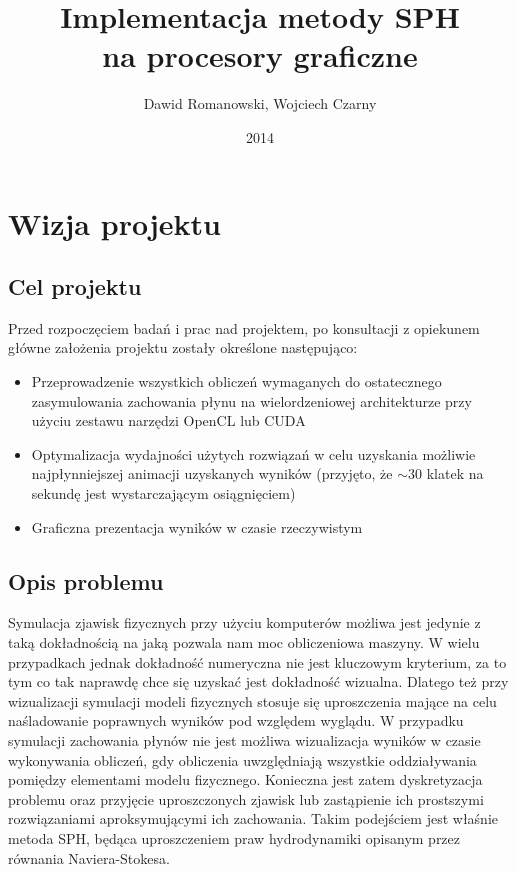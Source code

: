 \documentclass[polish, 12pt]{aghthesis}
\author{Dawid Romanowski, Wojciech Czarny}
\title{Implementacja metody SPH \\ na procesory graficzne}
\date{2014}
\begin{document}
\raggedbottom
\maketitle{}

\tableofcontents
\clearpage

\section{Wizja projektu}

	\subsection{Cel projektu}
	
	Przed rozpoczęciem badań i prac nad projektem, po konsultacji z opiekunem główne założenia projektu zostały określone następująco:
	
	\begin{itemize}
	
		\item Przeprowadzenie wszystkich obliczeń wymaganych do ostatecznego zasymulowania zachowania płynu na wielordzeniowej architekturze przy użyciu zestawu narzędzi OpenCL lub CUDA
		
		\item Optymalizacja wydajności użytych rozwiązań w celu uzyskania możliwie najpłynniejszej animacji uzyskanych wyników (przyjęto, że $\sim 30$ klatek na sekundę jest wystarczającym osiągnięciem)
		
		\item Graficzna prezentacja wyników w czasie rzeczywistym
	
	\end{itemize}
	
	\subsection{Opis problemu}
	
	Symulacja zjawisk fizycznych przy użyciu komputerów możliwa jest jedynie z taką dokładnością na jaką pozwala nam moc obliczeniowa maszyny. W wielu przypadkach jednak dokładność numeryczna nie jest kluczowym kryterium, za to tym co tak naprawdę chce się uzyskać jest dokładność wizualna. Dlatego też przy wizualizacji symulacji modeli fizycznych stosuje się uproszczenia mające na celu naśladowanie poprawnych wyników pod względem wyglądu. W przypadku symulacji zachowania płynów nie jest możliwa wizualizacja wyników w czasie wykonywania obliczeń, gdy obliczenia uwzględniają wszystkie oddziaływania pomiędzy elementami modelu fizycznego. Konieczna jest zatem dyskretyzacja problemu oraz przyjęcie uproszczonych zjawisk lub zastąpienie ich prostszymi rozwiązaniami aproksymującymi ich zachowania. Takim podejściem jest właśnie metoda SPH, będąca uproszczeniem praw hydrodynamiki opisanym przez równania Naviera-Stokesa.
	
\end{document}
